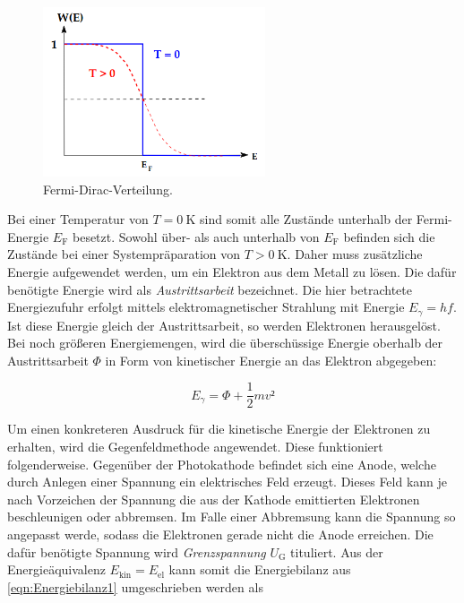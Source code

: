 \begin{figure}
    \centering
    \includegraphics[height=5cm]{FDV.png}
    \caption{Fermi-Dirac-Verteilung\cite{Versuchsanleitung_v500}.}
    \label{fig:FDV}
\end{figure}

\noindent Bei einer Temperatur von $T = \qty{0}{\kelvin}$ sind somit alle Zustände unterhalb der Fermi-Energie $E_\text{F}$ besetzt. Sowohl über- als auch unterhalb 
von $E_\text{F}$ befinden sich die Zustände bei einer Systempräparation von $T > \qty{0}{\kelvin}$. Daher muss zusätzliche Energie aufgewendet werden, um ein Elektron 
aus dem Metall zu lösen. Die dafür benötigte Energie wird als \emph{Austrittsarbeit} bezeichnet. Die hier betrachtete Energiezufuhr erfolgt mittels elektromagnetischer 
Strahlung mit Energie $E_\gamma = hf$. Ist diese Energie gleich der Austrittsarbeit, so werden Elektronen herausgelöst. Bei noch größeren Energiemengen, wird die
überschüssige Energie oberhalb der Austrittsarbeit $\Phi$ in Form von kinetischer Energie an das Elektron abgegeben:

\begin{equation}
    E_\gamma = \Phi + \frac{1}{2}mv²
\label{eqn:Energiebilanz1}
\end{equation}

\noindent Um einen konkreteren Ausdruck für die kinetische Energie der Elektronen zu erhalten, wird die Gegenfeldmethode angewendet. Diese funktioniert folgenderweise.
Gegenüber der Photokathode befindet sich eine Anode, welche durch Anlegen einer Spannung ein elektrisches Feld erzeugt. Dieses Feld kann je nach Vorzeichen der Spannung 
die aus der Kathode emittierten Elektronen beschleunigen oder abbremsen. Im Falle einer Abbremsung kann die Spannung so angepasst werde, sodass die Elektronen gerade nicht 
die Anode erreichen. Die dafür benötigte Spannung wird \emph{Grenzspannung} $U_\text{G}$ tituliert. Aus der Energieäquivalenz $E_\text{kin} =  E_\text{el}$ kann somit die 
Energiebilanz aus \eqref{eqn:Energiebilanz1} umgeschrieben werden als 

